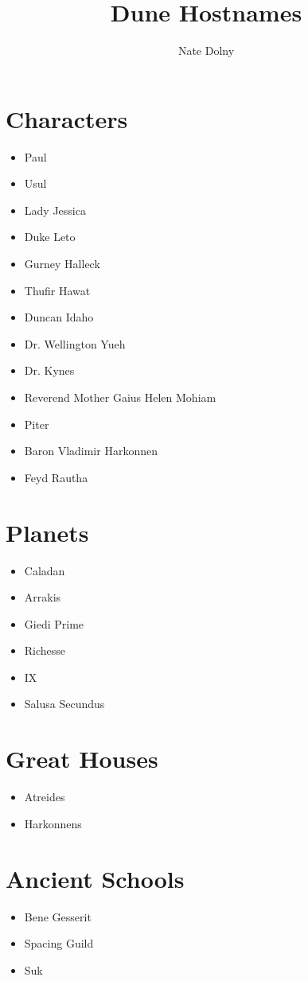 \documentclass{article}
\title{\textbf{Dune Hostnames}}
\author{Nate Dolny}
\date{}
\begin{document}
\maketitle

\section{Characters}
\begin{itemize}
\item Paul
\item Usul
\item Lady Jessica
\item Duke Leto
\item Gurney Halleck 
\item Thufir Hawat
\item Duncan Idaho 
\item Dr. Wellington Yueh
\item Dr. Kynes
\item Reverend Mother Gaius Helen Mohiam
\item Piter
\item Baron Vladimir Harkonnen 
\item Feyd Rautha
\end{itemize}

\section{Planets}
\begin{itemize}
\item Caladan 
\item Arrakis
\item Giedi Prime
\item Richesse
\item IX
\item Salusa Secundus
\end{itemize}

\section{Great Houses}
\begin{itemize}
\item Atreides 
\item Harkonnens
\end{itemize}

\section{Ancient Schools}
\begin{itemize}
\item Bene Gesserit 
\item Spacing Guild
\item Suk
\end{itemize}
\end{document}
